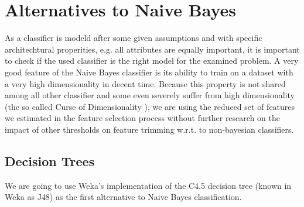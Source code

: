 \section{Alternatives to Naive Bayes}
As a classifier is modeld after some given assumptions and with specific architechtural properities, e.g. all attributes are equally important, it is important to check if the used classifier is the right model for the examined problem.
A very good feature of the Naive Bayes classifier is its ability to train on a dataset with a very high dimensionality in decent time.
Because this property is not shared among all other classifier and some even severely suffer from high dimensionality (the so called Curse of Dimensionality \cite{bellman1957dynamic}), we are using the reduced set of features we estimated in the feature selection process without further research on the impact of other thresholds on feature trimming w.r.t. to non-bayesian classifiers.

\subsection{Decision Trees}

We are going to use Weka's \cite{hall2009weka} implementation of the C4.5 decision tree \cite{Quinlan1993} (known in Weka as J48) as the first alternative to Naive Bayes classification.





